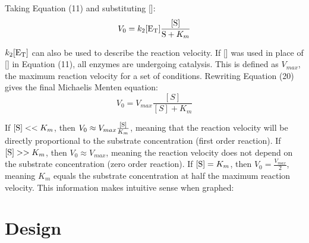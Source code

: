 \documentclass{article}
\begin{document}
Taking Equation (11) and substituting []:
\begin{equation}
    V_0 = k_2[\ce{E_T}]\frac{[\ce{S}]}{\ce{S} + K_m}
\end{equation}

$k_2[\ce{E_T}]$ can also be used to describe the reaction velocity. If [] was used in place of [] in Equation (11), all enzymes are undergoing catalysis. This is defined as $V_{max}$, the maximum reaction velocity for a set of conditions. Rewriting Equation (20) gives the final Michaelis Menten equation:
\begin{equation}
    V_0 = V_{max}\frac{[S]}{[S] + K_m}
\end{equation}

If $[\ce{S}] << K_m$, then $V_0 \approx V_{max}\frac{[\ce{S}]}{K_m}$, meaning that the reaction velocity will be directly proportional to the substrate concentration (first order reaction). If $[\ce{S}] >> K_m$, then $V_0 \approx V_{max}$, meaning the reaction velocity does not depend on the substrate concentration (zero order reaction). If $[\ce{S}] = K_m$, then $V_0 = \frac{V_{max}}{2}$, meaning $K_m$ equals the substrate concentration at half the maximum reaction velocity. This information makes intuitive sense when graphed:

\section{Design}

\newpage
\end{document}
